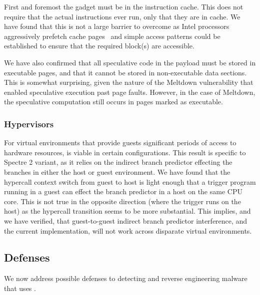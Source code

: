 First and foremost the gadget must be in the instruction cache. 
This does not require that the actual instructions ever run,
 only that they are in cache. We have 
found that this is not a large barrier to overcome as Intel 
processors aggressively prefetch cache pages~\cite{measuring-cache}
and simple access patterns could be established to ensure
that the required block(s) are accessible. 

We have also confirmed that all speculative code in the payload must be
stored in executable pages, and that it cannot be stored in non-executable data
sections. This is somewhat surprising, given the nature of the Meltdown
vulnerability that enabled speculative execution past page faults. However, in
the case of Meltdown, the speculative computation still occurs in pages marked
as executable.
\fi




\subsubsection{Hypervisors}
For virtual environments that provide guests significant periods of access to
hardware resources, \speculake is viable in certain configurations. 
This result is specific to Spectre 2 variant, as it relies on 
the indirect branch predictor effecting the branches in either the host 
or guest environment. We have found that the hypercall context switch from 
guest to host is light enough that a trigger program running in a guest
can effect the branch predictor in a host on the same CPU core. This is not
true in the opposite direction (where the trigger runs on the host) as the 
hypercall transition seems to be more substantial. This implies, and we have verified,
that guest-to-guest indirect branch predictor interference, and the current
\speculake implementation, will not work across disparate virtual environments.

\subsection{Defenses}
We now address possible defenses to detecting and reverse engineering malware
that uses \speculake. 


